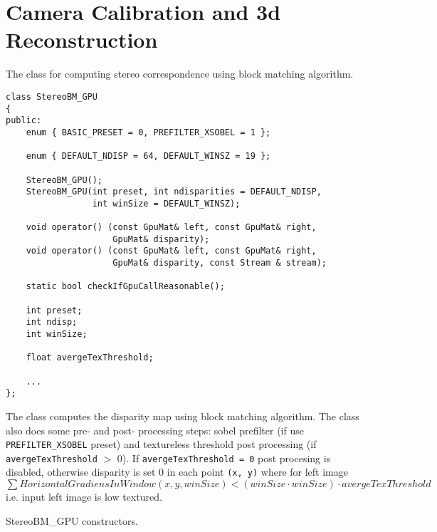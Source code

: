 \section{Camera Calibration and 3d Reconstruction}


The class for computing stereo correspondence using block matching algorithm.

\begin{lstlisting}
class StereoBM_GPU
{
public:
    enum { BASIC_PRESET = 0, PREFILTER_XSOBEL = 1 };

    enum { DEFAULT_NDISP = 64, DEFAULT_WINSZ = 19 };

    StereoBM_GPU();
    StereoBM_GPU(int preset, int ndisparities = DEFAULT_NDISP, 
                 int winSize = DEFAULT_WINSZ);

    void operator() (const GpuMat& left, const GpuMat& right, 
                     GpuMat& disparity);
    void operator() (const GpuMat& left, const GpuMat& right, 
                     GpuMat& disparity, const Stream & stream);

    static bool checkIfGpuCallReasonable();

    int preset;
    int ndisp;
    int winSize;

    float avergeTexThreshold;
    
    ...
};
\end{lstlisting}

The class computes the disparity map using block matching algorithm. The class also does some pre- and post- processing steps: sobel prefilter (if use \texttt{PREFILTER\_XSOBEL} preset) and textureless threshold post processing (if \texttt{avergeTexThreshold} $>$ 0). If \texttt{avergeTexThreshold = 0} post procesing is disabled, otherwise disparity is set 0 in each point \texttt{(x, y)} where for left image $\sum HorizontalGradiensInWindow(x, y, winSize) < (winSize \cdot winSize) \cdot avergeTexThreshold$ i.e. input left image is low textured.


\label{cppfunc.gpu.StereoBM.StereoBM}
StereoBM\_GPU constructors.


\begin{description}
\begin{description}
\end{description}
\end{description}


